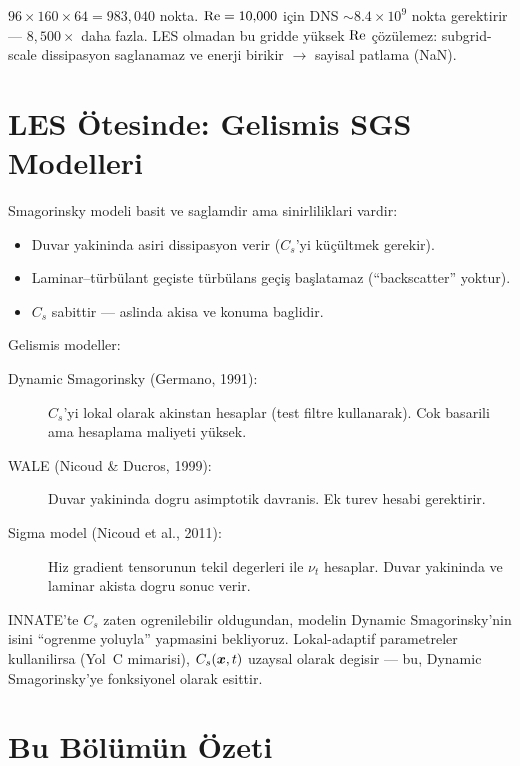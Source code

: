 $96\times160\times64 = 983{,}040$ nokta. $\mathrm{Re} = 10{,}000$ için DNS $\sim 8.4\times10^9$ nokta gerektirir --- $8{,}500\times$ daha fazla. LES olmadan bu gridde yüksek $\mathrm{Re}$ çözülemez: subgrid-scale dissipasyon saglanamaz ve enerji birikir $\to$ sayisal patlama (NaN).


\section{LES Ötesinde: Gelismis SGS Modelleri}
\label{sec:advanced_sgs}

Smagorinsky modeli basit ve saglamdir ama sinirliliklari vardir:

\begin{itemize}
\item Duvar yakininda asiri dissipasyon verir ($C_s$'yi küçültmek gerekir).
\item Laminar--türbülant geçiste türbülans geçiş başlatamaz (``backscatter'' yoktur).
\item $C_s$ sabittir --- aslinda akisa ve konuma baglidir.
\end{itemize}

Gelismis modeller:
\begin{description}
\item[Dynamic Smagorinsky (Germano, 1991):] $C_s$'yi lokal olarak akinstan hesaplar (test filtre kullanarak). Cok basarili ama hesaplama maliyeti yüksek.
\item[WALE (Nicoud \& Ducros, 1999):] Duvar yakininda dogru asimptotik davranis. Ek turev hesabi gerektirir.
\item[Sigma model (Nicoud et al., 2011):] Hiz gradient tensorunun tekil degerleri ile $\nu_t$ hesaplar. Duvar yakininda ve laminar akista dogru sonuc verir.
\end{description}

\begin{remark}
INNATE'te $C_s$ zaten ogrenilebilir oldugundan, modelin Dynamic Smagorinsky'nin isini ``ogrenme yoluyla'' yapmasini bekliyoruz. Lokal-adaptif parametreler kullanilirsa (Yol~C mimarisi), $C_s(\bm{x},t)$ uzaysal olarak degisir --- bu, Dynamic Smagorinsky'ye fonksiyonel olarak esittir.
\end{remark}


\section{Bu Bölümün Özeti}

